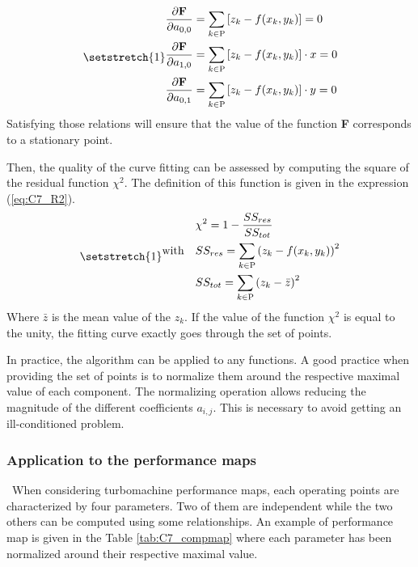 \begin{subequations}
\setstretch{1}
\begin{align}
    \frac{\partial \textbf{F}}{\partial a_{0,0}} &=\sum_{k\in\textsc{P}}\left[z_k - f(x_k, y_k)\right] = 0\\
    \frac{\partial \textbf{F}}{\partial a_{1,0}} &=\sum_{k\in\textsc{P}}\left[z_k - f(x_k, y_k)\right]\cdot x = 0\\
    \frac{\partial \textbf{F}}{\partial a_{0,1}} &=\sum_{k\in\textsc{P}}\left[z_k - f(x_k, y_k)\right]\cdot y = 0
\end{align}\label{eq:C7_lqcond}
\end{subequations}
Satisfying those relations will ensure that the value of the function \textbf{F} corresponds to a stationary point.

Then, the quality of the curve fitting can be assessed by computing the square of the residual function $\chi^2$. The definition of this function is given in the expression (\ref{eq:C7_R2}).
\begin{equation}
\setstretch{1}
\begin{aligned}
& & &  \chi^2 = 1 - \frac{SS_{res}}{SS_{tot}} \\
&\text{with}
& & SS_{res} = \sum_{k\in\textsc{P}}\left(z_k - f(x_k,y_k)\right)^2\\
& & & SS_{tot} = \sum_{k\in\textsc{P}}\left(z_k - \bar{z}\right)^2
\end{aligned}\label{eq:C7_R2}
\end{equation}
Where $\bar{z}$ is the mean value of the $z_k$. If the value of the function $\chi^2$ is equal to the unity, the fitting curve exactly goes through the set of points. 

In practice, the algorithm can be applied to any functions. A good practice when providing the set of points is to normalize them around the respective maximal value of each component. The normalizing operation allows reducing the magnitude of the different coefficients $a_{i,j}$. This is necessary to avoid getting an ill-conditioned problem.

\subsubsection{Application to the performance maps}
\quad\ When considering turbomachine performance maps, each operating points are characterized by four parameters. Two of them are independent while the two others can be computed using some relationships. An example of performance map is given in the Table \ref{tab:C7_compmap} where each parameter has been normalized around their respective maximal value.


